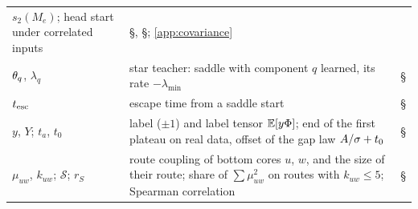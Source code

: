 \begin{xltabular}{\textwidth}{@{}>{\raggedright\arraybackslash}p{3.1cm}X
    >{\raggedright\arraybackslash}p{2.5cm}@{}}
    $s_2(M_e)$; head start under correlated inputs & \S{},
    \S{}; \cref{app:covariance} \\
  $\theta_q$, $\lambda_q$ & star teacher: saddle with component $q$ learned, its rate
    $-\lambda_{\min}$ & \S{} \\
  $t_{\rm esc}$ & escape time from a saddle start & \S{} \\
  $y$, $Y$; $t_a$, $t_0$ & label ($\pm1$) and label tensor $\mathbb{E}[y\Phi]$; end of the first plateau on real data,
    offset of the gap law $A/\sigma+t_0$ & \S{} \\
  $\mu_{uw}$, $k_{uw}$; $\mathcal S$; $r_S$ & route coupling of bottom cores $u$, $w$, and the size of their
    route; share of $\sum\mu_{uw}^2$ on routes with $k_{uw}\le5$; Spearman correlation
    & \S{} \\
\end{xltabular}
\endgroup
